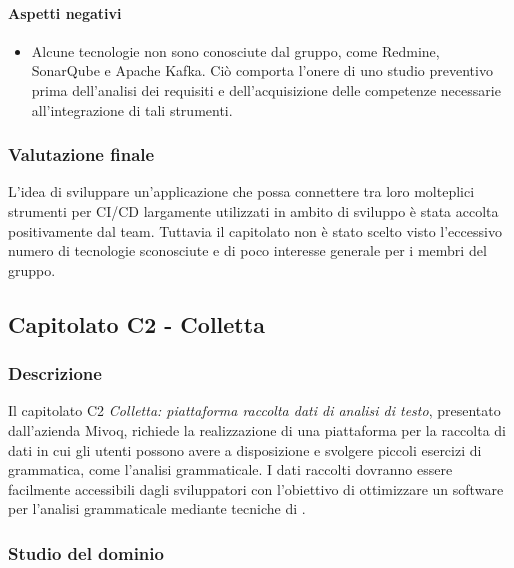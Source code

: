 	\paragraph{Aspetti negativi}
	\begin{itemize}
		\item {Alcune tecnologie non sono conosciute dal gruppo, come Redmine, SonarQube e Apache Kafka. Ciò comporta l'onere di uno studio preventivo prima dell'analisi dei requisiti e dell'acquisizione delle competenze necessarie all'integrazione di tali strumenti.}
	\end{itemize} 
	\subsubsection{Valutazione finale}
	L'idea di sviluppare un'applicazione che possa connettere tra loro molteplici strumenti per CI/CD largamente utilizzati in ambito di sviluppo è stata accolta positivamente dal team. Tuttavia il capitolato non è stato scelto visto l'eccessivo numero di tecnologie sconosciute e di poco interesse generale per i membri del gruppo.
	
	\subsection{Capitolato C2 - Colletta}
	\subsubsection{Descrizione}
	Il capitolato C2 \emph{Colletta: piattaforma raccolta dati di analisi di testo}, presentato dall'azienda Mivoq, richiede la realizzazione di una piattaforma per la raccolta di dati in cui gli utenti possono avere a disposizione e svolgere piccoli esercizi di grammatica, come l'analisi grammaticale.
	I dati raccolti dovranno essere facilmente accessibili dagli sviluppatori con l'obiettivo di ottimizzare un software per l'analisi grammaticale mediante tecniche di .   
	
	\subsubsection{Studio del dominio}
